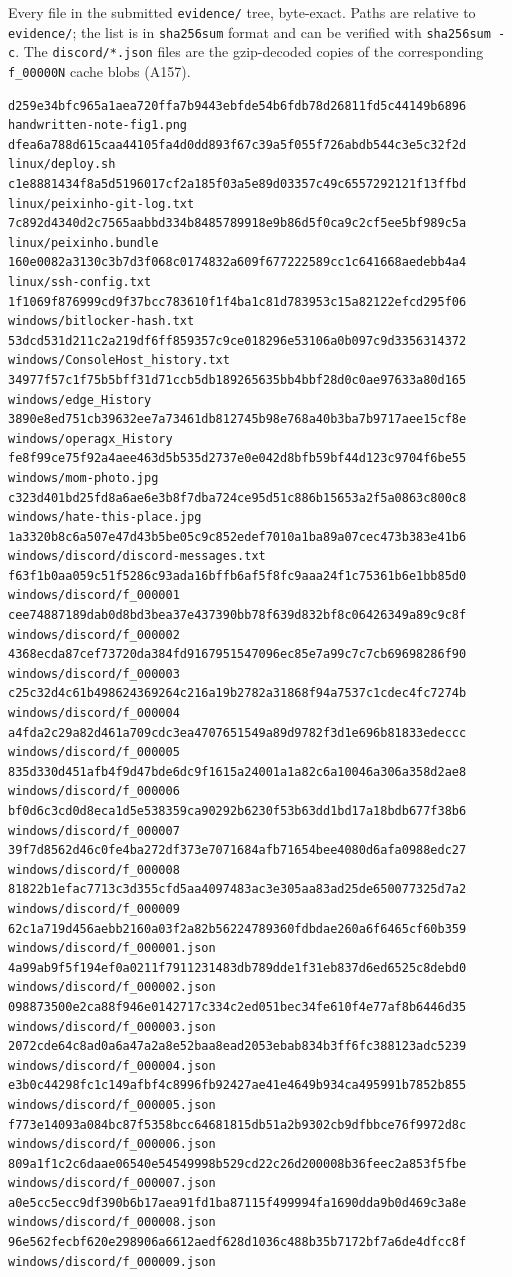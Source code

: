 \documentclass[11pt,a4paper,final,oneside]{article}
\begin{document}
Every file in the submitted \texttt{evidence/} tree, byte-exact. Paths are
relative to \texttt{evidence/}; the list is in \texttt{sha256sum} format and can
be verified with \texttt{sha256sum -c}. The \texttt{discord/*.json} files are the
gzip-decoded copies of the corresponding \texttt{f\_00000N} cache blobs (A157).

{\scriptsize
\begin{verbatim}
d259e34bfc965a1aea720ffa7b9443ebfde54b6fdb78d26811fd5c44149b6896  handwritten-note-fig1.png
dfea6a788d615caa44105fa4d0dd893f67c39a5f055f726abdb544c3e5c32f2d  linux/deploy.sh
c1e8881434f8a5d5196017cf2a185f03a5e89d03357c49c6557292121f13ffbd  linux/peixinho-git-log.txt
7c892d4340d2c7565aabbd334b8485789918e9b86d5f0ca9c2cf5ee5bf989c5a  linux/peixinho.bundle
160e0082a3130c3b7d3f068c0174832a609f677222589cc1c641668aedebb4a4  linux/ssh-config.txt
1f1069f876999cd9f37bcc783610f1f4ba1c81d783953c15a82122efcd295f06  windows/bitlocker-hash.txt
53dcd531d211c2a219df6ff859357c9ce018296e53106a0b097c9d3356314372  windows/ConsoleHost_history.txt
34977f57c1f75b5bff31d71ccb5db189265635bb4bbf28d0c0ae97633a80d165  windows/edge_History
3890e8ed751cb39632ee7a73461db812745b98e768a40b3ba7b9717aee15cf8e  windows/operagx_History
fe8f99ce75f92a4aee463d5b535d2737e0e042d8bfb59bf44d123c9704f6be55  windows/mom-photo.jpg
c323d401bd25fd8a6ae6e3b8f7dba724ce95d51c886b15653a2f5a0863c800c8  windows/hate-this-place.jpg
1a3320b8c6a507e47d43b5be05c9c852edef7010a1ba89a07cec473b383e41b6  windows/discord/discord-messages.txt
f63f1b0aa059c51f5286c93ada16bffb6af5f8fc9aaa24f1c75361b6e1bb85d0  windows/discord/f_000001
cee74887189dab0d8bd3bea37e437390bb78f639d832bf8c06426349a89c9c8f  windows/discord/f_000002
4368ecda87cef73720da384fd9167951547096ec85e7a99c7c7cb69698286f90  windows/discord/f_000003
c25c32d4c61b498624369264c216a19b2782a31868f94a7537c1cdec4fc7274b  windows/discord/f_000004
a4fda2c29a82d461a709cdc3ea4707651549a89d9782f3d1e696b81833edeccc  windows/discord/f_000005
835d330d451afb4f9d47bde6dc9f1615a24001a1a82c6a10046a306a358d2ae8  windows/discord/f_000006
bf0d6c3cd0d8eca1d5e538359ca90292b6230f53b63dd1bd17a18bdb677f38b6  windows/discord/f_000007
39f7d8562d46c0fe4ba272df373e7071684afb71654bee4080d6afa0988edc27  windows/discord/f_000008
81822b1efac7713c3d355cfd5aa4097483ac3e305aa83ad25de650077325d7a2  windows/discord/f_000009
62c1a719d456aebb2160a03f2a82b56224789360fdbdae260a6f6465cf60b359  windows/discord/f_000001.json
4a99ab9f5f194ef0a0211f7911231483db789dde1f31eb837d6ed6525c8debd0  windows/discord/f_000002.json
098873500e2ca88f946e0142717c334c2ed051bec34fe610f4e77af8b6446d35  windows/discord/f_000003.json
2072cde64c8ad0a6a47a2a8e52baa8ead2053ebab834b3ff6fc388123adc5239  windows/discord/f_000004.json
e3b0c44298fc1c149afbf4c8996fb92427ae41e4649b934ca495991b7852b855  windows/discord/f_000005.json
f773e14093a084bc87f5358bcc64681815db51a2b9302cb9dfbbce76f9972d8c  windows/discord/f_000006.json
809a1f1c2c6daae06540e54549998b529cd22c26d200008b36feec2a853f5fbe  windows/discord/f_000007.json
a0e5cc5ecc9df390b6b17aea91fd1ba87115f499994fa1690dda9b0d469c3a8e  windows/discord/f_000008.json
96e562fecbf620e298906a6612aedf628d1036c488b35b7172bf7a6de4dfcc8f  windows/discord/f_000009.json
\end{verbatim}
}
\end{document}
